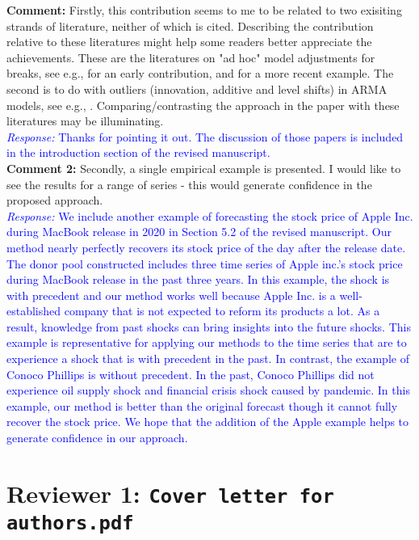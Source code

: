 \documentclass[12pt]{article}
\newcommand{\response}[1]{\noindent \textcolor{blue}{\emph{Response:} #1}}
\begin{document}
{\bf Comment:} Firstly, this contribution seems to me to be related to two exisiting strands of literature, neither of which is cited. Describing the contribution relative to these literatures might help some readers better appreciate the achievements.
These are the literatures on "ad hoc" model adjustments for breaks, see e.g.,  \cite{clements1996intercept} for an early contribution, and \cite{castle2015robust} for a more recent example. The second is to do with outliers (innovation, additive and level shifts) in ARMA models, see e.g., \cite{tsay1986time}. Comparing/contrasting the approach in the paper with these literatures may be illuminating. \\

\response{Thanks for pointing it out. The discussion of those papers is included in the introduction section of the revised manuscript.}\\

{\bf Comment 2:} Secondly, a single empirical example is presented. I would like to see the results for a range of series - this would generate confidence in the proposed approach. \\

\response{We include another example of forecasting the stock price of Apple Inc. during MacBook release in 2020 in Section 5.2 of the revised manuscript. Our method nearly perfectly recovers its stock price of the day after the release date. The donor pool constructed includes three time series of  Apple inc.'s stock price during MacBook release in the past three years. In this example, the shock is with precedent and our method works well because Apple Inc. is a well-established company that is not expected to reform its products a lot. As a result, knowledge from past shocks can bring insights into the future shocks. This example is representative for applying our methods to the time series that are to experience a shock that is with precedent in the past. In contrast, the example of Conoco Phillips is without precedent. In the past, Conoco Phillips  did not experience oil supply shock and financial crisis shock caused by  pandemic. In this example, our method is better than the original forecast though it cannot fully recover the stock price. We hope that the addition of the Apple example helps to generate confidence in our approach.
}

\newpage
\section*{Reviewer 1: \texttt{Cover letter for authors.pdf}}
\end{document}
